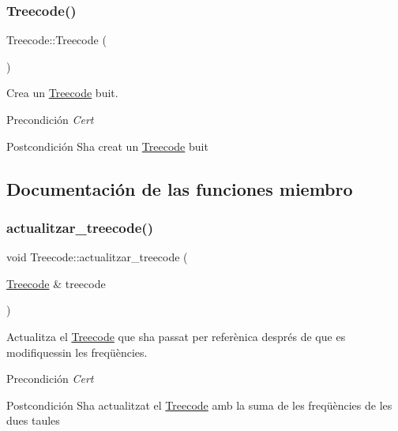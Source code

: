 \subsubsection{\texorpdfstring{Treecode()}{Treecode()}}
{\footnotesize\ttfamily Treecode\+::\+Treecode (\begin{DoxyParamCaption}{ }\end{DoxyParamCaption})}



Crea un \hyperlink{class_treecode}{Treecode} buit. 

\begin{DoxyPrecond}{Precondición}
{\itshape Cert} 
\end{DoxyPrecond}
\begin{DoxyPostcond}{Postcondición}
S\textquotesingle{}ha creat un \hyperlink{class_treecode}{Treecode} buit 
\end{DoxyPostcond}


\subsection{Documentación de las funciones miembro}
\mbox{\label{class_treecode_a4c82741ca239394a7aa65b701dc6856b}} 
\subsubsection{\texorpdfstring{actualitzar\+\_\+treecode()}{actualitzar\_treecode()}}
{\footnotesize\ttfamily void Treecode\+::actualitzar\+\_\+treecode (\begin{DoxyParamCaption}\item[{\hyperlink{class_treecode}{Treecode} \&}]{treecode }\end{DoxyParamCaption})}



Actualitza el \hyperlink{class_treecode}{Treecode} que s\textquotesingle{}ha passat per referènica després de que es modifiquessin les freqüències. 

\begin{DoxyPrecond}{Precondición}
{\itshape Cert} 
\end{DoxyPrecond}
\begin{DoxyPostcond}{Postcondición}
S\textquotesingle{}ha actualitzat el \hyperlink{class_treecode}{Treecode} amb la suma de les freqüències de les dues taules 
\end{DoxyPostcond}
\mbox{\label{class_treecode_aab621d8e906f628565e903028fc1d90b}} 
